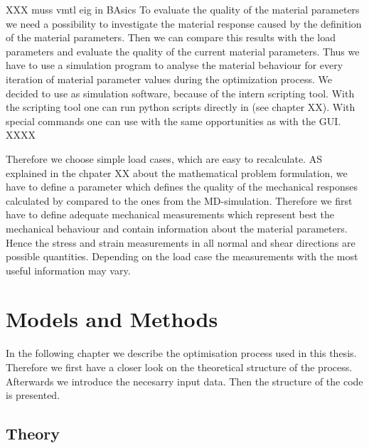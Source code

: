 
    XXX muss vmtl eig in BAsics
    To evaluate the quality of the material parameters we need a possibility to investigate the material response caused by the definition of the material parameters. Then we can compare this results with the load parameters and evaluate the quality of the current material parameters. Thus we have to use a simulation program to analyse the material behaviour for every iteration of material parameter values during the optimization process. We decided to use  as simulation software, because of the intern scripting tool. With the  scripting tool one can run python scripts directly in  (see chapter XX). With special  commands one can use  with the same opportunities as with the GUI. 
    XXXX

    Therefore we choose simple load cases, which are easy to recalculate. AS explained in the chpater XX about the mathematical problem formulation, we have to define a parameter which defines the quality of the mechanical responses calculated by  compared to the ones from the MD-simulation. Therefore we first have to define adequate mechanical measurements which represent best the mechanical behaviour and contain information about the material parameters. Hence the stress and strain measurements in all normal and shear directions are possible quantities. Depending on the load case the measurements with the most useful information may vary.
    

    
    \chapter{Models and Methods}

    In the following chapter we describe the optimisation process used in this thesis. Therefore we first have a closer look on the theoretical structure of the process. Afterwards we introduce the necesarry input data. Then the structure of the code is presented. 

    \section{Theory} \label{sec: methodTheory}

